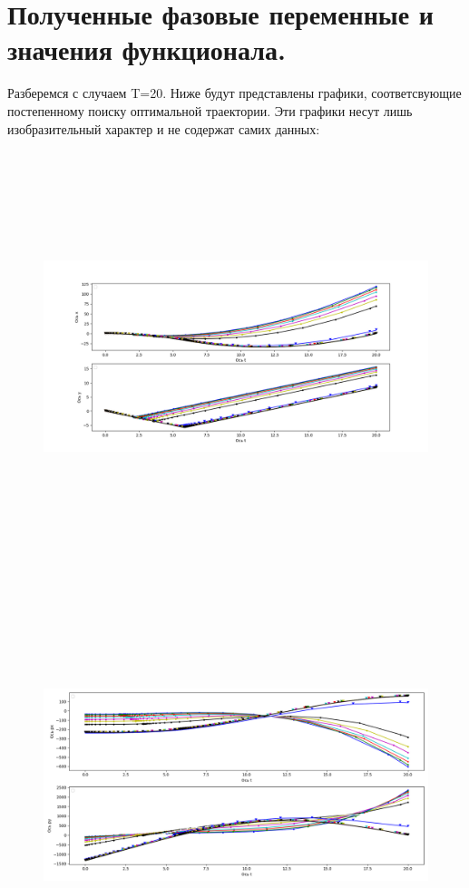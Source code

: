 \documentclass[a4paper,12pt]{article}
\begin{document}
\section{Полученные фазовые переменные и значения функционала.}
Разберемся с случаем T=20. Ниже будут представлены графики, соответсвующие постепенному поиску оптимальной траектории. Эти графики несут лишь изобразительный характер и не содержат самих данных:
\begin{figure}[H]
    \centering
      \includegraphics[width=\textwidth, height=12cm]{Figure2_1.png}
\end{figure}
\begin{figure}[H]
    \centering
      \includegraphics[width=\textwidth, height=12cm]{Figure2_2.png}
\end{figure}
\end{document}
